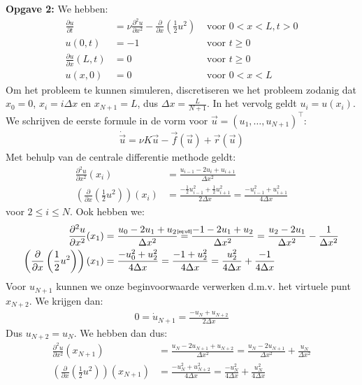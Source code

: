 \documentclass{article}
\newcommand{\myeq}[2]{\stackrel{\mathclap{\mbox{\normalfont\tiny\sffamily#1}}}{#2}}
\begin{document}
\textbf{Opgave 2:}
We hebben:
\begin{align}
\frac{\partial u}{\partial t} &= \nu \frac{\partial^2 u}{\partial x^2} -\frac{\partial}{\partial x}\left(\frac{1}{2}u^2\right) &\text{ voor } 0<x<L, t>0\\\label{eq:u0}
u(0,t) &= -1 &\text{ voor } t\geq 0\\
\frac{\partial u}{\partial x}(L,t) &= 0 &\text{ voor } t\geq 0\\
u(x,0) &= 0 &\text{ voor } 0<x<L
\end{align}
Om het probleem te kunnen simuleren, discretiseren we het probleem zodanig dat $x_0 = 0$, $x_i= i \Delta x$ en $x_{N+1}=L$, dus $\Delta x = \frac{L}{N+1}$.
In het vervolg geldt $u_i=u(x_i)$.
We schrijven de eerste formule in de vorm voor $\vec{u} = (u_1,\dots,u_{N+1})^\intercal$:
\begin{align*}
\dot{\vec{u}} = \nu K \vec{u} - \vec{f}(\vec{u})+\vec{r}(\vec{u})
\end{align*}
Met behulp van de centrale differentie methode geldt:
\begin{align*}
\frac{\partial^2 u}{\partial x^2}(x_i) &= \frac{u_{i-1}-2u_i+u_{i+1}}{\Delta x^2}\\
\left(\frac{\partial}{\partial x}\left(\frac{1}{2}u^2\right)\right)(x_i) &= \frac{-\frac{1}{2}u_{i-1}^2+\frac{1}{2}u_{i+1}^2}{2\Delta x}
= \frac{-u_{i-1}^2+u_{i+1}^2}{4\Delta x}
\end{align*}
voor $2\leq i\leq N$.
Ook hebben we:
\begin{align*}
\frac{\partial^2 u}{\partial x^2}(x_1) &= \frac{u_{0}-2u_1+u_{2}}{\Delta x^2}
\myeq{\eqref{eq:u0}}{=} \frac{-1-2u_1+u_{2}}{\Delta x^2}
= \frac{u_{2}-2u_1}{\Delta x^2} -\frac{1}{\Delta x^2}\\
\left(\frac{\partial}{\partial x}\left(\frac{1}{2}u^2\right)\right)(x_1) &= \frac{-u_{0}^2+u_{2}^2}{4\Delta x}
= \frac{-1+u_{2}^2}{4\Delta x}
= \frac{u_{2}^2}{4\Delta x}+\frac{-1}{4\Delta x}
\end{align*}
Voor $u_{N+1}$ kunnen we onze beginvoorwaarde verwerken d.m.v. het virtuele punt $x_{N+2}$.
We krijgen dan:
\begin{align*}
0=\dot{u}_{N+1} = \frac{-u_{N}+u_{N+2}}{2\Delta x}
\end{align*}
Dus $u_{N+2}=u_N$.
We hebben dan dus:
\begin{align*}
\frac{\partial^2 u}{\partial x^2}(x_{N+1}) &= \frac{u_{N}-2u_{N+1}+u_{N+2}}{\Delta x^2}
= \frac{u_{N}-2u_{N+1}}{\Delta x^2} +\frac{u_{N}}{\Delta x^2}\\
\left(\frac{\partial}{\partial x}\left(\frac{1}{2}u^2\right)\right)(x_{N+1}) &= \frac{-u_{N}^2+u_{N+2}^2}{4\Delta x}
= \frac{-u_{N}^2}{4\Delta x} +\frac{u_{N}^2}{4\Delta x}
\end{align*}
\end{document}
